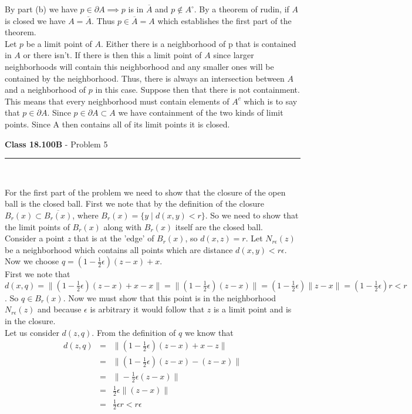 \documentclass[11pt,reqno]{article}
\begin{document}
By part (b) we have $p \in \partial A \implies p$ is in $\overline{A}$ and $p \notin A^\circ$. By a theorem of rudin, if $A$ is closed we have $A = \overline{A}$. Thus $p \in \overline{A} = A$ which establishes the first part of the theorem.\\ 
\indent Let $p$ be a limit point of $A$. Either there is a neighborhood of p that is contained in $A$ or there isn't. If there is then this a limit point of $A$ since larger neighborhoods will contain this neighborhood and any smaller ones will be contained by the neighborhood. Thus, there is always an intersection between $A$ and a neighborhood of $p$ in this case. Suppose then that there is not containment. This means that every neighborhood must contain elements of $A^c$ which is to say that $p \in \partial A$. Since $p \in \partial A \subset A$ we have containment of the two kinds of limit points. Since A then contains all of its limit points it is closed.

\vspace{15pt}
\begin{flushleft} 
\textbf{Class 18.100B} - Problem 5\\
\rule{500pt}{1pt}\\
\end{flushleft} 

For the first part of the problem we need to show that the closure of the open ball is the closed ball. First we note that by the definition of the closure $B_r(x) \subset \overline{B_r(x)}$, where $B_r(x) = \{ y \; | \; d(x,y) < r\}$. So we need to show that the limit points of $B_r(x)$ along with $B_r(x)$ itself are the closed ball.  \\
\indent Consider a point $z$ that is at the 'edge' of $B_r(x)$, so $d(x,z) = r$. Let $N_{r \epsilon}(z)$ be a  neighborhood which contains all points which are distance $d(x,y) < r \epsilon$. Now  we choose $q = (1-\frac{1}{2}\epsilon)(z-x)+ x$. \\
\indent First we note that $d(x,q) =\|(1-\frac{1}{2}\epsilon)(z-x)+x - x \| = \|(1-\frac{1}{2}\epsilon)(z-x) \| = (1-\frac{1}{2}\epsilon) \|z - x \| = (1-\frac{1}{2}\epsilon) r < r$. So $q \in B_r(x)$. Now we must show that this point is in the neighborhood $N_{r \epsilon}(z)$ and because $\epsilon$ is arbitrary it would follow that $z$ is a limit point and is in the closure.\\
\indent Let us consider $d(z,q)$. From the definition of $q$ we know that 
\begin{eqnarray*}
d(z,q) & = & \| (1-\frac{1}{2}\epsilon)(z-x) + x -z \| \\
	  & = & \| (1-\frac{1}{2}\epsilon)(z-x) - (z -x) \| \\
	  & = & \| -\frac{1}{2}\epsilon(z-x) \| \\
	  & = & \frac{1}{2}\epsilon \| (z-x) \| \\
	  & = & \frac{1}{2}\epsilon r < r \epsilon
\end{eqnarray*}
\end{document}
